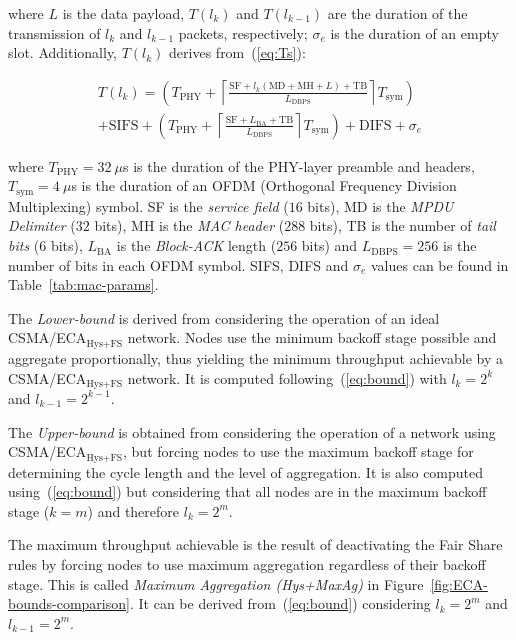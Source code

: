 \documentclass[a4paper,journal]{IEEEtran}
\begin{document}
	where $L$ is the data payload, $T(l_{k})$ and $T(l_{k-1})$ are the duration of the transmission of $l_{k}$ and $l_{k-1}$ packets, respectively; $\sigma_{e}$ is the duration of an empty slot. Additionally, $T(l_{k})$ derives from~(\ref{eq:Ts}):

	\begin{multline}\label{eq:Ts}
		T(l_{k})= \left( T_{\text{PHY}} + \left\lceil \frac{ \text{SF} + l_{k} (\text{MD}+\text{MH}+L) + \text{TB}}{L_{\text{DBPS}}}\right\rceil T_{\text{sym}} \right) \\ 
		+ \text{SIFS}+\left(T_{\text{PHY}} + \left\lceil\frac{\text{SF} + L_{\text{BA}} + \text{TB}}{L_{\text{DBPS}}} \right \rceil T_{\text{sym}} \right) + \text{DIFS} + \sigma_{e}
	\end{multline}

	where $T_{\text{PHY}}=32~\mu$s is the duration of the PHY-layer preamble and headers, $T_{\text{sym}}=4~\mu$s is the duration of an OFDM (Orthogonal Frequency Division Multiplexing) symbol. SF is the \emph{service field} ($16$ bits), $\text{MD}$ is the \textit{MPDU Delimiter} ($32$ bits), MH is the \emph{MAC header} ($288$ bits), TB is the number of \emph{tail bits} ($6$ bits), $L_{\text{BA}}$ is the \emph{Block-ACK} length ($256$ bits) and $L_{\text{DBPS}}=256$ is the number of bits in each OFDM symbol. SIFS, DIFS and $\sigma_{e}$ values can be found in Table~\ref{tab:mac-params}.

	The \emph{Lower-bound} is derived from considering the operation of an ideal CSMA/ECA$_{\text{Hys+FS}}$ network. Nodes use the minimum backoff stage possible and aggregate proportionally, thus yielding the minimum throughput achievable by a CSMA/ECA$_{\text{Hys+FS}}$ network. It is computed following~(\ref{eq:bound}) with $l_{k}=2^{k}$ and $l_{k-1}=2^{k-1}$.

	The \emph{Upper-bound} is obtained from considering the operation of a network using CSMA/ECA$_{\text{Hys+FS}}$, but forcing nodes to use the maximum backoff stage for determining the cycle length and the level of aggregation. It is also computed using~(\ref{eq:bound}) but considering that all nodes are in the maximum backoff stage ($k=m$) and therefore $l_{k}=2^{m}$.

	The maximum throughput achievable is the result of deactivating the Fair Share rules by forcing nodes to use maximum aggregation regardless of their backoff stage. This is called \emph{Maximum Aggregation (Hys+MaxAg)} in Figure~\ref{fig:ECA-bounds-comparison}. It can be derived from~(\ref{eq:bound}) considering $l_{k} = 2^{m}$ and $l_{k-1}=2^{m}$.
\end{document}
